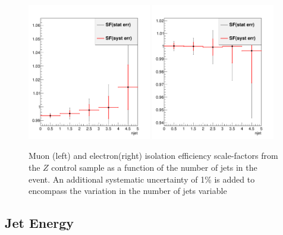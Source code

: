 \begin{figure}[htbp]
\begin{center}
\includegraphics[width=0.48\textwidth]{figs/systematics/MuTP_sf_njet_ALP}
\includegraphics[width=0.48\textwidth]{figs/systematics/EleTP_sf_njet_ALP}
\caption{Muon (left) and electron(right) isolation efficiency scale-factors from the $Z$ control sample as a function of the number of jets in the event. An additional systematic uncertainty of 1\% is added to encompass the variation in the number of jets variable}
\label{figure:systematics_iso}
\end{center}
\end{figure}


\subsection{Jet Energy}

